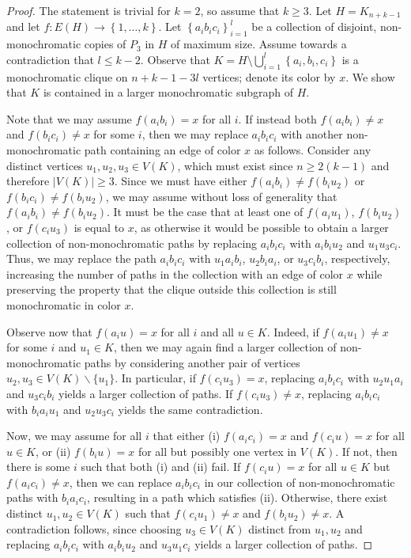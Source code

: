 \documentclass[10pt,a4paper]{amsart}
\newcommand\abs[1]{\left\lvert #1 \right\rvert}
\newcommand\set[1]{\left\{ #1 \right\}}
\begin{document}
\begin{proof}
    The statement is trivial for $k=2$, so assume that $k\geq 3$. Let $H=K_{n+k-1}$ and let $f:E(H)\to \set{1,\ldots,k}$. Let $\set{a_ib_ic_i}_{i=1}^{l}$ be a collection of disjoint, non-monochromatic copies of $P_3$ in $H$ of maximum size. Assume towards a contradiction that $l\leq k-2$. Observe that $K=H\setminus\bigcup_{i=1}^{l}\set{a_i,b_i,c_i}$ is a monochromatic clique on $n+k-1-3l$ vertices; denote its color by $x$. We show that $K$ is contained in a larger monochromatic subgraph of $H$.
    
    Note that we may assume $f(a_ib_i)=x$ for all $i$. If instead both $f(a_ib_i)\neq x$ and $f(b_ic_i)\neq x$ for some $i$, then we may replace $a_ib_ic_i$ with another non-monochromatic path containing an edge of color $x$ as follows. Consider any distinct vertices $u_1,u_2,u_3\in V(K)$, which must exist since $n\geq 2(k-1)$ and therefore $\abs{V(K)}\geq 3$. 
    Since we must have either $f(a_ib_i)\neq f(b_iu_2)$ or $f(b_ic_i)\neq f(b_iu_2)$, we may assume without loss of generality that $f(a_ib_i)\neq f(b_iu_2)$. 
    It must be the case that at least one of $f(a_iu_1)$, $f(b_iu_2)$, or $f(c_iu_3)$ is equal to $x$, as otherwise it would be possible to obtain a larger collection of non-monochromatic paths by replacing $a_ib_ic_i$ with $a_ib_iu_2$ and $u_1u_3c_i$. Thus, we may replace the path $a_ib_ic_i$ with $u_1a_ib_i$, $u_2b_ia_i$, or $u_3c_ib_i$, respectively, increasing the number of paths in the collection with an edge of color $x$ while preserving the property that the clique outside this collection is still monochromatic in color $x$.

    Observe now that $f(a_iu)=x$ for all $i$ and all $u\in K$. Indeed, if $f(a_iu_1)\neq x$ for some $i$ and $u_1\in K$, then we may again find a larger collection of non-monochromatic paths by considering another pair of vertices $u_2,u_3\in V(K)\backslash\{u_1\}$. In particular, if $f(c_iu_3)=x$, replacing $a_ib_ic_i$ with $u_2u_1a_i$ and $u_3c_ib_i$ yields a larger collection of paths. If $f(c_iu_3)\neq x$, replacing $a_ib_ic_i$ with $b_ia_iu_1$ and $u_2u_3c_i$ yields the same contradiction. 

    Now, we may assume for all $i$ that either (i) $f(a_ic_i)=x$ and $f(c_iu)=x$ for all $u\in K$, or (ii) $f(b_iu)=x$ for all but possibly one vertex in $V(K)$. If not, then there is some $i$ such that both (i) and (ii) fail. If $f(c_iu)=x$ for all $u\in K$ but $f(a_ic_i)\neq x$, then we can replace $a_ib_ic_i$ in our collection of non-monochromatic paths with $b_ia_ic_i$, resulting in a path which satisfies (ii).  Otherwise, there exist distinct $u_1,u_2\in V(K)$ such that $f(c_iu_1)\neq x$ and $f(b_iu_2)\neq x$. A contradiction follows, since choosing $u_3\in V(K)$ distinct from $u_1,u_2$ and replacing $a_ib_ic_i$ with $a_ib_iu_2$ and $u_3u_1c_i$ yields a larger collection of paths. 


\end{proof}
\end{document}
